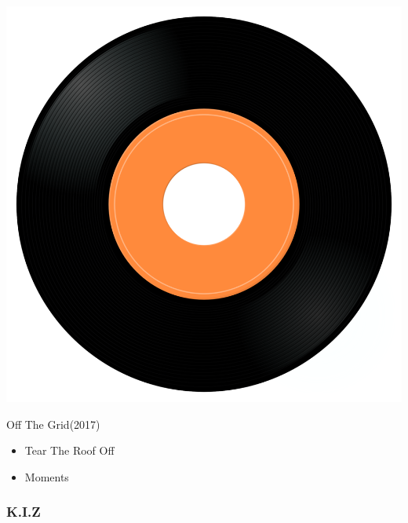 \begin{minipage}[t]{0.25\textwidth}\vspace{0pt}
\captionsetup{type=figure}
\includegraphics[width=\textwidth]{Images/cover.png}
\caption*{Off The Grid(2017)}
\end{minipage}
\begin{minipage}[t]{0.25\textwidth}\vspace{0pt}
\begin{itemize}[nosep,leftmargin=1em,labelwidth=*,align=left]
	\setlength{\itemsep}{0pt}
	\item Tear The Roof Off
	\item Moments
\end{itemize}
\end{minipage}

\subsubsection{K.I.Z}

